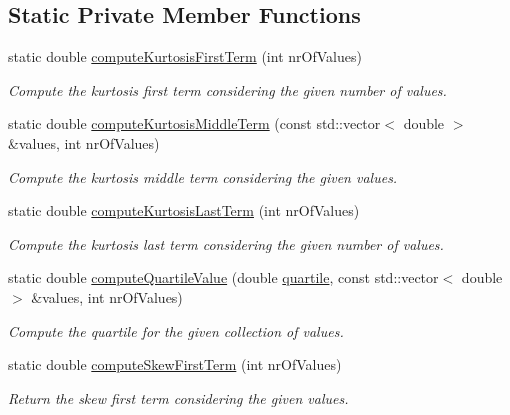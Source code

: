 \subsection*{Static Private Member Functions}
\begin{DoxyCompactItemize}
\item 
static double \hyperlink{classmultiscale_1_1Numeric_a1621cda906f63dd3c3866047ef85fefc}{compute\-Kurtosis\-First\-Term} (int nr\-Of\-Values)
\begin{DoxyCompactList}\small\item\em Compute the kurtosis first term considering the given number of values. \end{DoxyCompactList}\item 
static double \hyperlink{classmultiscale_1_1Numeric_a4b78b74100f02ec7239c53a34431a602}{compute\-Kurtosis\-Middle\-Term} (const std\-::vector$<$ double $>$ \&values, int nr\-Of\-Values)
\begin{DoxyCompactList}\small\item\em Compute the kurtosis middle term considering the given values. \end{DoxyCompactList}\item 
static double \hyperlink{classmultiscale_1_1Numeric_a7c1b060479a2a90f61f55d3a4974f4b8}{compute\-Kurtosis\-Last\-Term} (int nr\-Of\-Values)
\begin{DoxyCompactList}\small\item\em Compute the kurtosis last term considering the given number of values. \end{DoxyCompactList}\item 
static double \hyperlink{classmultiscale_1_1Numeric_a4189a889b6207303bfc977f6e0b1218d}{compute\-Quartile\-Value} (double \hyperlink{classmultiscale_1_1Numeric_a127a2b3e5e659b4e493767ba23fc45da}{quartile}, const std\-::vector$<$ double $>$ \&values, int nr\-Of\-Values)
\begin{DoxyCompactList}\small\item\em Compute the quartile for the given collection of values. \end{DoxyCompactList}\item 
static double \hyperlink{classmultiscale_1_1Numeric_a5daee6bbc3b6eb9a10db03a7b212af3b}{compute\-Skew\-First\-Term} (int nr\-Of\-Values)
\begin{DoxyCompactList}\small\item\em Return the skew first term considering the given values. \end{DoxyCompactList}\item 

\end{DoxyCompactItemize}
